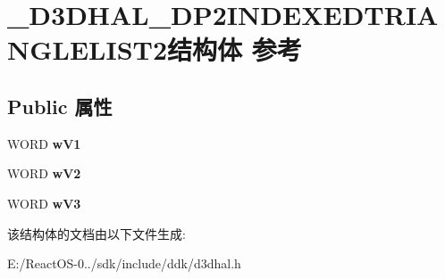 \hypertarget{struct___d3_d_h_a_l___d_p2_i_n_d_e_x_e_d_t_r_i_a_n_g_l_e_l_i_s_t2}{}\section{\+\_\+\+D3\+D\+H\+A\+L\+\_\+\+D\+P2\+I\+N\+D\+E\+X\+E\+D\+T\+R\+I\+A\+N\+G\+L\+E\+L\+I\+S\+T2结构体 参考}
\label{struct___d3_d_h_a_l___d_p2_i_n_d_e_x_e_d_t_r_i_a_n_g_l_e_l_i_s_t2}
\subsection*{Public 属性}
\begin{DoxyCompactItemize}
\item 
\mbox{\label{struct___d3_d_h_a_l___d_p2_i_n_d_e_x_e_d_t_r_i_a_n_g_l_e_l_i_s_t2_a719e988c33452c687becfb24464b8dc1}} 
W\+O\+RD {\bfseries w\+V1}
\item 
\mbox{\label{struct___d3_d_h_a_l___d_p2_i_n_d_e_x_e_d_t_r_i_a_n_g_l_e_l_i_s_t2_a5eff6de1b67eec837462bc3cac73fa08}} 
W\+O\+RD {\bfseries w\+V2}
\item 
\mbox{\label{struct___d3_d_h_a_l___d_p2_i_n_d_e_x_e_d_t_r_i_a_n_g_l_e_l_i_s_t2_aa0f120a5403a417d0eba718d324c1c91}} 
W\+O\+RD {\bfseries w\+V3}
\end{DoxyCompactItemize}


该结构体的文档由以下文件生成\+:\begin{DoxyCompactItemize}
\item 
E\+:/\+React\+O\+S-\/0../sdk/include/ddk/d3dhal.\+h\end{DoxyCompactItemize}
